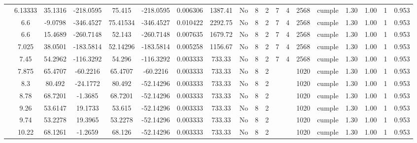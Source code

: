 \begin{table}[H]
{\begin{tabular}{|c|c|c|c|c|c|r|c|c|c|c|c|c|c|c|c|c|c|c|}
\cline{2-19}        & 6.13333 & 35.1316 & -218.0595 & 75.415 & -218.0595 & 0.006306 & 1387.41 & No  & 8   & 2   & 7   & 4   & 2568 & \cellcolor[rgb]{ .776,  .937,  .808}cumple & 1.30 & 1.00 & 1   & 0.953 \bigstrut\\
\cline{2-19}        & \cellcolor[rgb]{ .851,  .882,  .949}6.6 & -9.0798 & -346.4527 & 75.41534 & -346.4527 & 0.010422 & 2292.75 & No  & 8   & 2   & 7   & 4   & 2568 & \cellcolor[rgb]{ .776,  .937,  .808}cumple & 1.30 & 1.00 & 1   & 0.953 \bigstrut\\
\cline{2-19}        & \cellcolor[rgb]{ .851,  .882,  .949}6.6 & 15.4689 & -260.7148 & 52.143 & -260.7148 & 0.007635 & 1679.72 & No  & 8   & 2   & 7   & 4   & 2568 & \cellcolor[rgb]{ .776,  .937,  .808}cumple & 1.30 & 1.00 & 1   & 0.953 \bigstrut\\
\cline{2-19}        & 7.025 & 38.0501 & -183.5814 & 52.14296 & -183.5814 & 0.005258 & 1156.67 & No  & 8   & 2   & 7   & 4   & 2568 & \cellcolor[rgb]{ .776,  .937,  .808}cumple & 1.30 & 1.00 & 1   & 0.953 \bigstrut\\
\cline{2-19}        & 7.45 & 54.2962 & -116.3292 & 54.296 & -116.3292 & 0.003333 & 733.33 & No  & 8   & 2   & 7   & 4   & 2568 & \cellcolor[rgb]{ .776,  .937,  .808}cumple & 1.30 & 1.00 & 1   & 0.953 \bigstrut\\
\cline{2-19}        & 7.875 & 65.4707 & -60.2216 & 65.4707 & -60.2216 & 0.003333 & 733.33 & No  & 8   & 2   &     &     & 1020 & \cellcolor[rgb]{ .776,  .937,  .808}cumple & 1.30 & 1.00 & 1   & 0.953 \bigstrut\\
\cline{2-19}        & 8.3 & 80.492 & -24.1772 & 80.492 & -52.14296 & 0.003333 & 733.33 & No  & 8   & 2   &     &     & 1020 & \cellcolor[rgb]{ .776,  .937,  .808}cumple & 1.30 & 1.00 & 1   & 0.953 \bigstrut\\
\cline{2-19}        & 8.78 & 68.7201 & -1.3685 & 68.7201 & -52.14296 & 0.003333 & 733.33 & No  & 8   & 2   &     &     & 1020 & \cellcolor[rgb]{ .776,  .937,  .808}cumple & 1.30 & 1.00 & 1   & 0.953 \bigstrut\\
\cline{2-19}        & 9.26 & 53.6147 & 19.1733 & 53.615 & -52.14296 & 0.003333 & 733.33 & No  & 8   & 2   &     &     & 1020 & \cellcolor[rgb]{ .776,  .937,  .808}cumple & 1.30 & 1.00 & 1   & 0.953 \bigstrut\\
\cline{2-19}        & 9.74 & 53.2278 & 19.3965 & 53.2278 & -52.14296 & 0.003333 & 733.33 & No  & 8   & 2   &     &     & 1020 & \cellcolor[rgb]{ .776,  .937,  .808}cumple & 1.30 & 1.00 & 1   & 0.953 \bigstrut\\
\cline{2-19}        & 10.22 & 68.1261 & -1.2659 & 68.126 & -52.14296 & 0.003333 & 733.33 & No  & 8   & 2   &     &     & 1020 & \cellcolor[rgb]{ .776,  .937,  .808}cumple & 1.30 & 1.00 & 1   & 0.953 \bigstrut\\

\end{tabular}}
\end{table}
